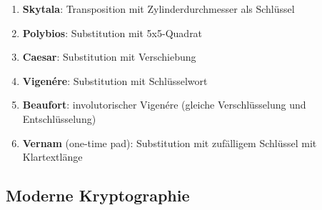 \documentclass{article}
\begin{document}
\begin{enumerate}
  \item \textbf{Skytala}: Transposition mit Zylinderdurchmesser als Schlüssel
  \item \textbf{Polybios}: Substitution mit 5x5-Quadrat
  \item \textbf{Caesar}: Substitution mit Verschiebung
  \item \textbf{Vigenére}: Substitution mit Schlüsselwort
  \item \textbf{Beaufort}: involutorischer Vigenére (gleiche Verschlüsselung und Entschlüsselung)
  \item \textbf{Vernam} (one-time pad): Substitution mit zufälligem Schlüssel mit Klartextlänge
\end{enumerate}

\subsection{Moderne Kryptographie}
\end{document}

